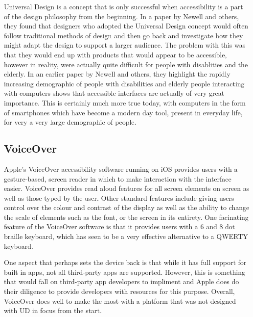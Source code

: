 Universal Design is a concept that is only successful when accessibility is a part of the design philosophy from the beginning\cite{incldesign}.
In a paper by Newell and others\cite{incldesign}, they found that designers who adopted the Universal Design concept would often follow traditional methods of design and then go back and investigate how they might adapt the design to support a larger audience.
The problem with this was that they would end up with products that would appear to be accessible, however in reality, were actually quite difficult for people with disablities and the elderly.
In an earlier paper by Newell and others, they highlight the rapidly increasing demographic of people with disabilities and elderly people interacting with computers shows that accessible interfaces are actually of very great importance\cite{computerinterface}.
This is certainly much more true today, with computers in the form of smartphones which have become a modern day tool, present in everyday life, for very a very large demographic of people.


\subsection{VoiceOver}
Apple's VoiceOver accessibility software running on iOS provides users with a gesture-based, screen reader in which to make interaction with the interface easier\cite{iphone}.
VoiceOver provides read aloud features for all screen elements on screen as well as those typed by the user.
Other standard features include giving users control over the colour and contrast of the display as well as the ability to change the scale of elements such as the font, or the screen in its entirety.
One facinating feature of the VoiceOver software is that it provides users with a 6 and 8 dot braille keyboard, which has seen to be a very effective alternative to a QWERTY keyboard. %

One aspect that perhaps sets the device back is that while it has full support for built in apps, not all third-party apps are supported.
However, this is something that would fall on third-party app developers to impliment and Apple does do their diligence to provide developers with resources for this purpose\cite{iphonedev}.
Overall, VoiceOver does well to make the most with a platform that was not designed with UD in focus from the start.

